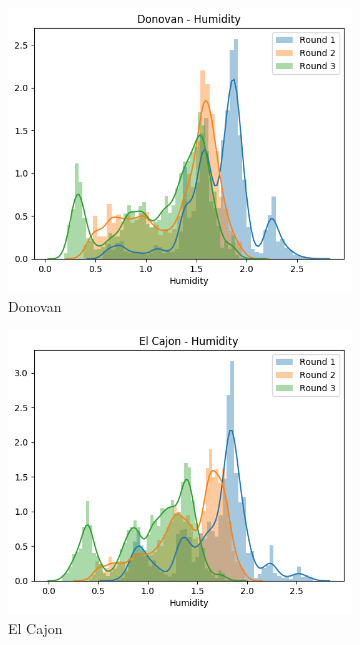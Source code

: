 \documentclass[journal abbreviation, manuscript]{copernicus}
\begin{document}
\begin{figure}[H]
\centering
\begin{subfigure}{0.32\textwidth}
\includegraphics[width=\textwidth]{results/distributions/location_donovan_humidity.png}
\caption{Donovan}
\end{subfigure}
\begin{subfigure}{0.32\textwidth}
\includegraphics[width=\textwidth]{results/distributions/location_elcajon_humidity.png}
\caption{El Cajon}
\end{subfigure}
\begin{subfigure}{0.32\textwidth}

\end{subfigure}
\end{figure}
\end{document}
